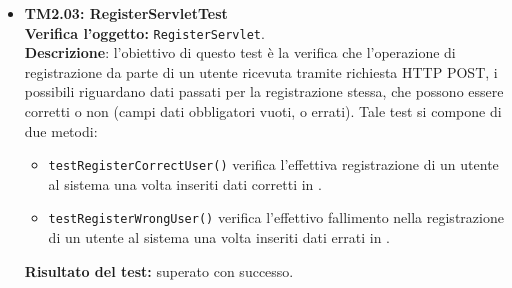 \begin{itemize}
\item \textbf{TM2.03: RegisterServletTest}\\
\textbf{Verifica l'oggetto:} \texttt{RegisterServlet}.\\
\textbf{Descrizione}: l'obiettivo di questo test è la verifica che l'operazione di registrazione da parte di un utente ricevuta tramite richiesta HTTP POST, i possibili  riguardano dati passati per la registrazione stessa, che possono essere corretti o non (campi dati obbligatori vuoti, o errati).
Tale test si compone di due metodi:
\begin{itemize}
\item \texttt{testRegisterCorrectUser()} verifica l'effettiva registrazione di un utente al sistema una volta inseriti dati corretti in .
\item \texttt{testRegisterWrongUser()}  verifica l'effettivo fallimento nella registrazione di un utente al sistema una volta inseriti dati errati in .
\end{itemize}
\textbf{Risultato del test:} superato con successo.
\end{itemize}

